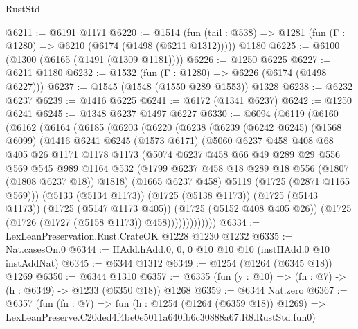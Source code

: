 \begin{lexlean}{RustStd}
\begin{coremodule}
@6211 := @6191 @1171
@6220 := @1514
    (fun (tail : @538) => @1281 (fun (Γ : @1280) => @6210 (@6174 (@1498 (@6211 @1312)))))
    @1180
@6225 := @6100 (@1300 (@6165 (@1491 (@1309 @1181))))
@6226 := @1250 @6225
@6227 := @6211 @1180
@6232 := @1532 (fun (Γ : @1280) => @6226 (@6174 (@1498 @6227)))
@6237 := @1545 (@1548 (@1550 @289 @1553)) @1328
@6238 := @6232 @6237
@6239 := @1416 @6225
@6241 := @6172 (@1341 @6237)
@6242 := @1250 @6241
@6245 := @1348 @6237 @1497 @6227
@6330 := @6094
    (@6119
      (@6160
        (@6162
          (@6164
            (@6185
              (@6203
                (@6220
                  (@6238
                    (@6239
                      (@6242 @6245)
                      (@1568 @6099)
                      (@1416
                        @6241
                        @6245
                        (@1573 @6171)
                        (@5060
                          @6237
                          @458
                          @408
                          @68
                          @405
                          @26
                          @1171
                          @1178
                          @1173
                          (@5074
                            @6237
                            @458
                            @66
                            @49
                            @289
                            @29
                            @556
                            @569
                            @545
                            @989
                            @1164
                            @532
                            (@1799 @6237 @458 @18 @289 @18 @556 (@1807 (@1808 @6237 @18)) @1818)
                            (@1665 @6237 @458)
                            @5119
                            (@1725 (@2871 @1165 @569)))
                          (@5133 (@5134 @1173))
                          (@1725 (@5138 @1173))
                          (@1725 (@5143 @1173))
                          (@1725 (@5147 @1173 @405))
                          (@1725 (@5152 @408 @405 @26))
                          (@1725 (@1726 (@1727 (@5158 @1173)) @458)))))))))))))
@6334 := LexLeanPreservation.Rust.CrateOK @1228 @1230 @1232
@6335 := Nat.casesOn.{0}
@6344 := HAdd.hAdd.{0, 0, 0} @10 @10 @10 (instHAdd.{0} @10 instAddNat)
@6345 := @6344 @1312
@6349 := @1254 (@1264 (@6345 @18)) @1269
@6350 := @6344 @1310
@6357 := @6335 (fun (y : @10) => (fn : @7) -> (h : @6349) -> @1233 (@6350 @18)) @1268
@6359 := @6344 Nat.zero
@6367 := @6357
    (fun (fn : @7) =>
    fun (h : @1254 (@1264 (@6359 @18)) @1269) =>
    LexLeanPreserve.C20ded4f4be0e5011a640fb6c30888a67.R8.RustStd.fun0)

\end{coremodule}
\end{lexlean}
